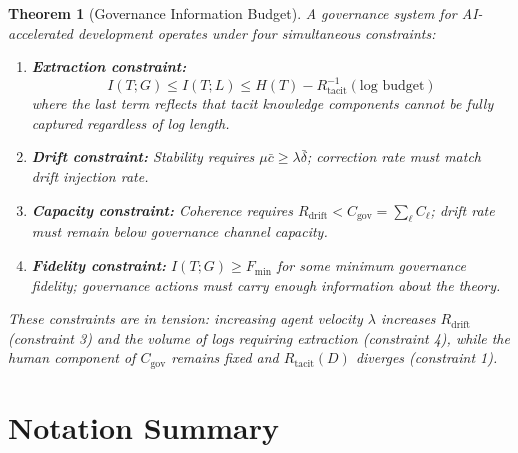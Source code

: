 \documentclass[11pt, a4paper, logo, copyright]{googledeepmind}
\newtheorem{theorem}{Theorem}[section]
\begin{document}
\begin{theorem}[Governance Information Budget]
A governance system for AI-accelerated development operates under four simultaneous constraints:

\begin{enumerate}
    \item \textbf{Extraction constraint:}
    \begin{equation}
        I(T; G) \leq I(T; L) \leq H(T) - R_{\mathrm{tacit}}^{-1}(\text{log budget})
    \end{equation}
    where the last term reflects that tacit knowledge components cannot be fully captured regardless of log length.

    \item \textbf{Drift constraint:} Stability requires $\mu \bar{c} \geq \lambda \bar{\delta}$; correction rate must match drift injection rate.

    \item \textbf{Capacity constraint:} Coherence requires $R_{\mathrm{drift}} < C_{\mathrm{gov}} = \sum_\ell C_\ell$; drift rate must remain below governance channel capacity.

    \item \textbf{Fidelity constraint:} $I(T; G) \geq F_{\min}$ for some minimum governance fidelity; governance actions must carry enough information about the theory.
\end{enumerate}

These constraints are in tension: increasing agent velocity $\lambda$ increases $R_{\mathrm{drift}}$ (constraint 3) and the volume of logs requiring extraction (constraint 4), while the human component of $C_{\mathrm{gov}}$ remains fixed and $R_{\mathrm{tacit}}(D)$ diverges (constraint 1).
\end{theorem}

\section{Notation Summary}
\label{app:notation}
\end{document}
